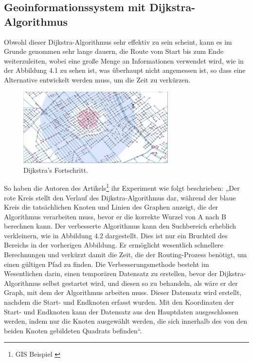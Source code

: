 \subsection{Geoinformationssystem mit Dijkstra-Algorithmus}
Obwohl dieser Dijkstra-Algorithmus sehr effektiv zu sein scheint, kann es im Grunde genommen sehr lange dauern, die Route vom Start bis zum Ende weiterzuleiten, wobei eine große Menge an Informationen verwendet wird, wie in der Abbildung 4.1 zu sehen ist, was überhaupt nicht angemessen ist, so dass eine Alternative entwickelt werden muss, um die Zeit zu verkürzen\cite{Research-id11}.

\begin{figure}[H]
	\centering
	\includegraphics[width=0.7\textwidth]{images/GIS_red.PNG}
	\caption{\label{fig:GIS_red}Dijkstra's Fortschritt\cite{Research-id11}.}
\end{figure}

So haben die Autoren des Artikels\footnote{GIS Beispiel \cite{Research-id11}}  ihr Experiment wie folgt beschrieben:
\newline
\newline
 „Der rote Kreis stellt den Verlauf des Dijkstra-Algorithmus dar, während der blaue Kreis die tatsächlichen Knoten und Linien des Graphen anzeigt, die der Algorithmus verarbeiten muss, bevor er die korrekte Wurzel von A nach B berechnen kann. Der verbesserte Algorithmus kann den Suchbereich erheblich verkleinern, wie in Abbildung 4.2 dargestellt. Dies ist nur ein Bruchteil des Bereichs in der vorherigen Abbildung. Er ermöglicht wesentlich schnellere Berechnungen und verkürzt damit die Zeit, die der Routing-Prozess benötigt, um einen gültigen Pfad zu finden. Die Verbesserungsmethode besteht im Wesentlichen darin, einen temporären Datensatz zu erstellen, bevor der Dijkstra-Algorithmus selbst gestartet wird, und diesen so zu behandeln, als wäre er der Graph, mit dem der Algorithmus arbeiten muss. Dieser Datensatz wird erstellt, nachdem die Start- und Endknoten erfasst wurden. Mit den Koordinaten der Start- und Endknoten kann der Datensatz aus den Hauptdaten ausgeschlossen werden, indem nur die Knoten ausgewählt werden, die sich innerhalb des von den beiden Knoten gebildeten Quadrats befinden“.


